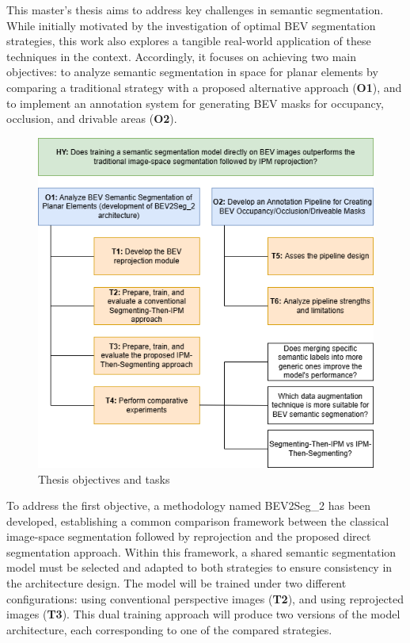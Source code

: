 This master's thesis aims to address key challenges in  semantic segmentation. While initially motivated by the investigation of optimal BEV segmentation strategies, this work also explores a tangible real-world application of these techniques in the  context. Accordingly, it focuses on achieving two main objectives: to analyze semantic segmentation in  space for planar elements by comparing a traditional strategy with a proposed alternative approach (\textbf{O1}), and to implement an annotation system for generating BEV masks for occupancy, occlusion, and drivable areas (\textbf{O2}).

\begin{figure}[h!]
    \centering
    \includegraphics[width=0.8\linewidth]{./images/objectives/TFM_Objectives.png}
    \caption{Thesis objectives and tasks}
    \label{fig:objectives}
\end{figure}

To address the first objective, a methodology named BEV2Seg\_2 has been developed, establishing a common comparison framework between the classical image-space segmentation followed by  reprojection and the proposed direct  segmentation approach. Within this framework, a shared semantic segmentation model must be selected and adapted to both strategies to ensure consistency in the architecture design. The model will be trained under two different configurations: using conventional perspective images (\textbf{T2}), and using  reprojected images (\textbf{T3}). This dual training approach will produce two versions of the model architecture, each corresponding to one of the compared strategies.

